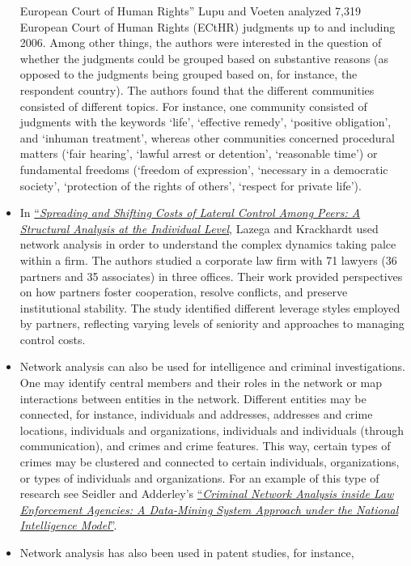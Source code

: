 \begin{itemize}
{{  European Court of Human Rights}''} Lupu and Voeten analyzed 7,319
  European Court of Human Rights (ECtHR) judgments up to and including
  2006. Among other things, the authors were interested in the question
  of whether the judgments could be grouped based on substantive reasons
  (as opposed to the judgments being grouped based on, for instance, the
  respondent country). The authors found that the different communities
  consisted of different topics. For instance, one community consisted
  of judgments with the keywords `life', `effective remedy', `positive
  obligation', and `inhuman treatment', whereas other communities
  concerned procedural matters (`fair hearing', `lawful arrest or
  detention', `reasonable time') or fundamental freedoms (`freedom of
  expression', `necessary in a democratic society', `protection of the
  rights of others', `respect for private life').
\item
  In \href{https://doi.org/10.1023/A:1004759418226}{``\emph{Spreading
  and Shifting Costs of Lateral Control Among Peers: A Structural
  Analysis at the Individual Level}}, Lazega and Krackhardt used network
  analysis in order to understand the complex dynamics taking palce
  within a firm. The authors studied a corporate law firm with 71
  lawyers (36 partners and 35 associates) in three offices. Their work
  provided perspectives on how partners foster cooperation, resolve
  conflicts, and preserve institutional stability. The study identified
  different leverage styles employed by partners, reflecting varying
  levels of seniority and approaches to managing control costs.
\item
  Network analysis can also be used for intelligence and criminal
  investigations. One may identify central members and their roles in
  the network or map interactions between entities in the network.
  Different entities may be connected, for instance, individuals and
  addresses, addresses and crime locations, individuals and
  organizations, individuals and individuals (through communication),
  and crimes and crime features. This way, certain types of crimes may
  be clustered and connected to certain individuals, organizations, or
  types of individuals and organizations. For an example of this type of
  research see Seidler and Adderley's
  \href{https://doi.org/10.1350/ijps.2013.15.4.321}{``\emph{Criminal
  Network Analysis inside Law Enforcement Agencies: A Data-Mining System
  Approach under the National Intelligence Model}''}.
\item
  Network analysis has also been used in patent studies, for instance,

\end{itemize}
